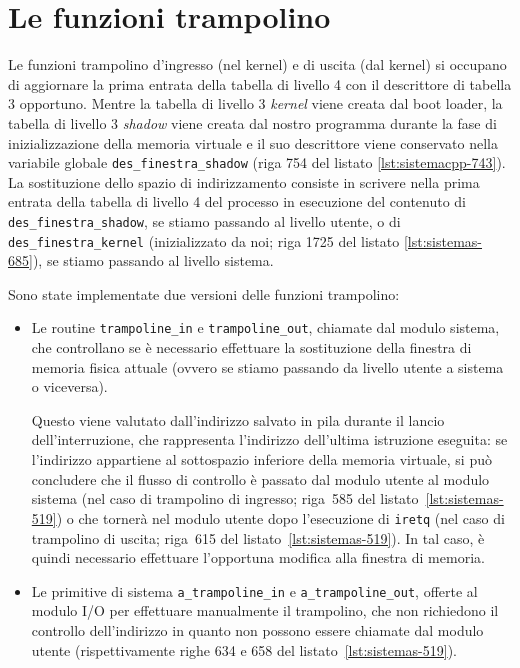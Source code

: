 \section{Le funzioni trampolino}
Le funzioni trampolino d'ingresso (nel kernel) e di uscita (dal kernel) si occupano di aggiornare la prima entrata della tabella di livello 4 con il descrittore di tabella 3 opportuno.
Mentre la tabella di livello 3 \emph{kernel} viene creata dal boot loader, la tabella di livello 3 \emph{shadow} viene creata dal nostro programma durante la fase di inizializzazione della memoria virtuale e il suo descrittore viene conservato nella variabile globale \texttt{des\_finestra\_shadow} (riga 754 del listato \vref{lst:sistemacpp-743}).
La sostituzione dello spazio di indirizzamento consiste in scrivere nella prima entrata della tabella di livello 4 del processo in esecuzione del contenuto di \texttt{des\_finestra\_shadow}, se stiamo passando al livello utente, o di \texttt{des\_finestra\_kernel} (inizializzato da noi; riga 1725 del listato \vref{lst:sistemas-685}), se stiamo passando al livello sistema.

Sono state implementate due versioni delle funzioni trampolino:
\noindent
\begin{itemize}
	\item Le routine \texttt{trampoline\_in} e \texttt{trampoline\_out}, chiamate dal modulo sistema, che controllano se è necessario effettuare la sostituzione della finestra di memoria fisica attuale (ovvero se stiamo passando da livello utente a sistema o viceversa).
	
	Questo viene valutato dall'indirizzo salvato in pila durante il lancio dell'interruzione, che rappresenta l'indirizzo dell'ultima istruzione eseguita: se l'indirizzo appartiene al sottospazio inferiore della memoria virtuale, si può concludere che il flusso di controllo è passato dal modulo utente al modulo sistema (nel caso di trampolino di ingresso; riga~585 del listato~\vref{lst:sistemas-519}) o che tornerà nel modulo utente dopo l'esecuzione di \texttt{iretq} (nel caso di trampolino di uscita; riga~615 del listato~\vref{lst:sistemas-519}).
	In tal caso, è quindi necessario effettuare l'opportuna modifica alla finestra di memoria.\\
	
	\item Le primitive di sistema \texttt{a\_trampoline\_in} e \texttt{a\_trampoline\_out}, offerte al modulo I/O per effettuare manualmente il trampolino, che non richiedono il controllo dell'indirizzo in quanto non possono essere chiamate dal modulo utente (rispettivamente righe 634 e 658 del listato~\vref{lst:sistemas-519}).
\end{itemize}

